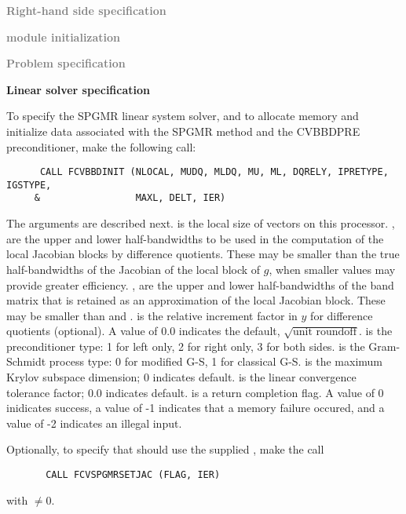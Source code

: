 \begin{Steps}
  
\item \textcolor{gray}{\bf Right-hand side specification}

\item \textcolor{gray}{\bf {\nvector} module initialization}

\item \textcolor{gray}{\bf Problem specification}

\item {\bf Linear solver specification}

  To specify the SPGMR linear system solver, and to allocate memory 
  and initialize data associated with the SPGMR method and the CVBBDPRE
  preconditioner, make the following call:
\begin{verbatim}
      CALL FCVBBDINIT (NLOCAL, MUDQ, MLDQ, MU, ML, DQRELY, IPRETYPE, IGSTYPE,
     &                 MAXL, DELT, IER)
\end{verbatim}
  The arguments are described next.
  is the local size of vectors on this processor.
  ,  
  are the upper and lower half-bandwidths to be used in the computation
  of the local Jacobian blocks by difference quotients.
  These may be smaller than the true half-bandwidths of the
  Jacobian of the local block of $g$, when smaller values may
  provide greater efficiency.
  ,  are the upper and lower half-bandwidths of the band matrix that 
  is retained as an approximation of the local Jacobian block.
  These may be smaller than  and .
   is the relative increment factor in $y$ for difference quotients
  (optional). A value of $0.0$ indicates the default, $\sqrt{\text{unit roundoff}}$.
   is the preconditioner type: 1 for left only, 2 for right only, 
  3 for both sides.
   is the Gram-Schmidt process type: 0 for modified G-S, 1 for classical G-S.
   is the maximum Krylov subspace dimension; 0 indicates default.
   is the linear convergence tolerance factor; 0.0 indicates default.
   is a return completion flag.  A value of 0 inidicates success, a value of
  -1 indicates that a memory failure occured, and a value of -2 indicates an 
  illegal input.
  
  Optionally, to specify that {\spgmr} should use the supplied , 
  make the call
\begin{verbatim}
       CALL FCVSPGMRSETJAC (FLAG, IER)
\end{verbatim}
  with $\neq 0$.
  

\end{Steps}

